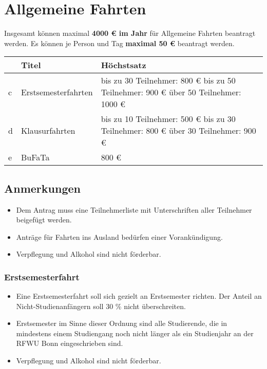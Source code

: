 \documentclass{article}
\begin{document}
\section{Allgemeine Fahrten}
    Insgesamt können maximal \textbf{4000 € im Jahr} für Allgemeine Fahrten beantragt werden. \newline
    Es können je Person und Tag \textbf{maximal 50 €} beantragt werden.\\
    
    \setlength\extrarowheight{2mm} \sffamily    
    \begin{tabular}{l||L{6cm}|L{7cm}}
    
    	&\textbf{Titel} &  \textbf{Höchstsatz}\\ \hline \hline
    	c &
    	Erstsemesterfahrten &
    	
    	bis zu 30 Teilnehmer: 800 € \newline
    	bis zu 50 Teilnehmer: 900 € \newline
    	über 50 Teilnehmer: 1000 €\\ \hline
    
    	d &
    	Klausurfahrten &
    	bis zu 10 Teilnehmer: 500 € \newline
    	bis zu 30 Teilnehmer: 800 € \newline
    	über 30 Teilnehmer: 900 €  \\ \hline
    	
    	e &
    	BuFaTa &
    	800 € \\
    \end{tabular}
    \rmfamily
    \subsection{Anmerkungen}
        \begin{itemize}
            \item Dem Antrag muss eine Teilnehmerliste mit Unterschriften aller Teilnehmer beigefügt werden.
            \item Anträge für Fahrten ins Ausland bedürfen einer Vorankündigung.
            \item Verpflegung und Alkohol sind nicht förderbar.
        \end{itemize}
        \subsubsection{Erstsemesterfahrt}
            \begin{itemize}
                \item  Eine Erstsemesterfahrt soll sich gezielt an Erstsemester richten.
                Der Anteil an Nicht-Studienanfängern soll 30 \% nicht überschreiten.
                \item Erstsemester im Sinne dieser Ordnung sind alle Studierende, die in mindestens einem Studiengang noch nicht länger als ein Studienjahr an der RFWU Bonn eingeschrieben sind.
            	\item Verpflegung und Alkohol sind nicht förderbar.
            \end{itemize}
\end{document}
